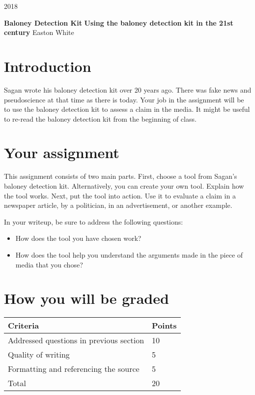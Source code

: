 \documentclass[11pt,]{article}
\title{}
\author{}
\date{}
\providecommand{\tightlist}{%
  \setlength{\itemsep}{0pt}\setlength{\parskip}{0pt}}
\begin{document}
\begin{flushright} 2018 \end{flushright}

\textbf{\Large Baloney Detection Kit} \newline
\textbf{Using the baloney detection kit in the 21st century} \newline
Easton White

\section{Introduction}

Sagan wrote his baloney detection kit over 20 years ago. There was fake
news and pseudoscience at that time as there is today. Your job in the
assignment will be to use the baloney detection kit to assess a claim in
the media. It might be useful to re-read the baloney detection kit from
the beginning of class.

\section{Your assignment}

This assignment consists of two main parts. First, choose a tool from
Sagan's baloney detection kit. Alternatively, you can create your own
tool. Explain how the tool works. Next, put the tool into action. Use it
to evaluate a claim in a newspaper article, by a politician, in an
advertisement, or another example.

In your writeup, be sure to address the following questions:

\begin{itemize}
\tightlist
\item
  How does the tool you have chosen work?
\item
  How does the tool help you understand the arguments made in the piece
  of media that you chose?
\end{itemize}

\section{How you will be graded}

\begin{table}[!h]
\begin{tabular}{l | l}
    Criteria & Points \\ \hline \hline
    Addressed questions in previous section & 10 \\
    Quality of writing & 5 \\
    Formatting and referencing the source & 5 \\ \hline
    Total & 20
\end{tabular}
\end{table}
\end{document}
